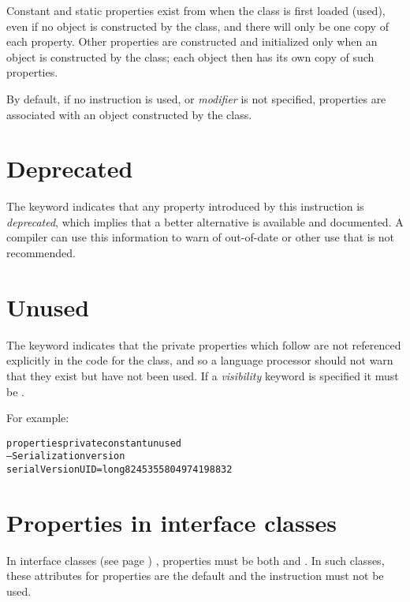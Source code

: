 Constant and static properties exist from when the class is first loaded
(used), even if no object is constructed by the class, and there will
only be one copy of each property.  Other properties are constructed and
initialized only when an object is constructed by the class; each object
then has its own copy of such properties.
 
By default, if no  instruction is used, or
\emph{modifier} is not specified, properties are associated with an
object constructed by the class.
\section{Deprecated}\label{refdeppro}
 
The keyword  indicates that any property introduced by
this instruction is \emph{deprecated}, which implies that a
better alternative is available and documented.  A compiler can
use this information to warn of out-of-date or other use that is
not recommended.
\section{Unused}\label{refunupro}
 
The keyword  indicates that the private properties
which follow are not referenced explicitly in the code for the class,
and so a language processor should not warn that they exist but have not
been used.
If a \emph{visibility} keyword is specified it must be
.
 
For example:
\begin{alltt}
properties private constant unused
  -- Serialization version
  serialVersionUID=long 8245355804974198832
\end{alltt}
\section{Properties in interface classes}
 
In  interface classes (see page \pageref{refinterf}) , properties must be both
 and .  In such classes, these
attributes for properties are the default and the 
instruction must not be used.
